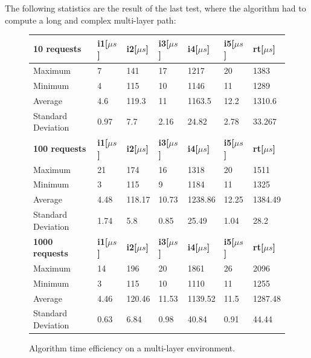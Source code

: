 \documentclass[10pt,a4paper]{report}
\begin{document}
The following statistics are the result of the last test, where the
algorithm had to compute a long and complex multi-layer path:

\begin{figure}[!htbp]
  \begin{center}
    \begin{tabular}{|l||l|l|l|l|l||l|}
      \hline
      \textbf{10 requests} & \textbf{i1[\(\mu s\)]} & \textbf{i2[\(\mu s\)]} & \textbf{i3[\(\mu s\)]} & \textbf{i4[\(\mu s\)]} &
      \textbf{i5[\(\mu s\)]} & \textbf{rt[\(\mu s\)]} \\\hline
      Maximum & 7 & 141 & 17 & 1217 & 20 & 1383 \\
      Minimum & 4 & 115 & 10 & 1146 & 11 & 1289 \\
      Average & 4.6 & 119.3 & 11 & 1163.5 & 12.2 & 1310.6 \\
      Standard Deviation & 0.97 & 7.7 & 2.16 & 24.82 & 2.78 & 33.267
      \\ \hline
      \textbf{100 requests} & \textbf{i1[\(\mu s\)]} & \textbf{i2[\(\mu s\)]} & \textbf{i3[\(\mu s\)]} & \textbf{i4[\(\mu s\)]} &
      \textbf{i5[\(\mu s\)]} & \textbf{rt[\(\mu s\)]} \\\hline
      Maximum & 21 & 174 & 16 & 1318 & 20 & 1511 \\
      Minimum & 3 & 115 & 9 & 1184 & 11 & 1325 \\
      Average & 4.48 & 118.17 & 10.73 & 1238.86 & 12.25 & 1384.49 \\
      Standard Deviation & 1.74 & 5.8 & 0.85 & 25.49 & 1.04 & 28.2 
      \\ \hline
      \textbf{1000 requests} & \textbf{i1[\(\mu s\)]} & \textbf{i2[\(\mu s\)]} & \textbf{i3[\(\mu s\)]} & \textbf{i4[\(\mu s\)]} &
      \textbf{i5[\(\mu s\)]} & \textbf{rt[\(\mu s\)]} \\\hline
      Maximum & 14 & 196 & 20 & 1861 & 26 & 2096 \\
      Minimum & 3 & 115 & 10 & 1110 & 11 & 1255 \\
      Average & 4.46 & 120.46 & 11.53 & 1139.52 & 11.5 & 1287.48 \\
      Standard Deviation & 0.63 & 6.84 & 0.98 & 40.84 & 0.91 & 44.44
      \\ \hline
    \end{tabular}
    \caption[Time efficiency on multi-layer]{Algorithm time
      efficiency on a multi-layer environment.}
    \label{fig:test_opt}
  \end{center}
\end{figure}
\end{document}
